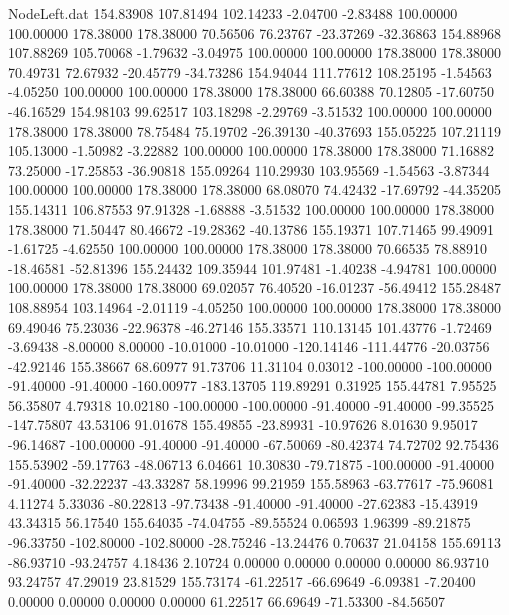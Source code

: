 \begin{filecontents}{NodeLeft.dat}
 154.83908  107.81494  102.14233    -2.04700   -2.83488  100.00000  100.00000  178.38000  178.38000   70.56506   76.23767  -23.37269  -32.36863
 154.88968  107.88269  105.70068    -1.79632   -3.04975  100.00000  100.00000  178.38000  178.38000   70.49731   72.67932  -20.45779  -34.73286
 154.94044  111.77612  108.25195    -1.54563   -4.05250  100.00000  100.00000  178.38000  178.38000   66.60388   70.12805  -17.60750  -46.16529
 154.98103   99.62517  103.18298    -2.29769   -3.51532  100.00000  100.00000  178.38000  178.38000   78.75484   75.19702  -26.39130  -40.37693
 155.05225  107.21119  105.13000    -1.50982   -3.22882  100.00000  100.00000  178.38000  178.38000   71.16882   73.25000  -17.25853  -36.90818
 155.09264  110.29930  103.95569    -1.54563   -3.87344  100.00000  100.00000  178.38000  178.38000   68.08070   74.42432  -17.69792  -44.35205
 155.14311  106.87553   97.91328    -1.68888   -3.51532  100.00000  100.00000  178.38000  178.38000   71.50447   80.46672  -19.28362  -40.13786
 155.19371  107.71465   99.49091    -1.61725   -4.62550  100.00000  100.00000  178.38000  178.38000   70.66535   78.88910  -18.46581  -52.81396
 155.24432  109.35944  101.97481    -1.40238   -4.94781  100.00000  100.00000  178.38000  178.38000   69.02057   76.40520  -16.01237  -56.49412
 155.28487  108.88954  103.14964    -2.01119   -4.05250  100.00000  100.00000  178.38000  178.38000   69.49046   75.23036  -22.96378  -46.27146
 155.33571  110.13145  101.43776    -1.72469   -3.69438   -8.00000    8.00000  -10.01000  -10.01000 -120.14146 -111.44776  -20.03756  -42.92146
 155.38667   68.60977   91.73706    11.31104    0.03012 -100.00000 -100.00000  -91.40000  -91.40000 -160.00977 -183.13705  119.89291    0.31925
 155.44781    7.95525   56.35807     4.79318   10.02180 -100.00000 -100.00000  -91.40000  -91.40000  -99.35525 -147.75807   43.53106   91.01678
 155.49855  -23.89931  -10.97626     8.01630    9.95017  -96.14687 -100.00000  -91.40000  -91.40000  -67.50069  -80.42374   74.72702   92.75436
 155.53902  -59.17763  -48.06713     6.04661   10.30830  -79.71875 -100.00000  -91.40000  -91.40000  -32.22237  -43.33287   58.19996   99.21959
 155.58963  -63.77617  -75.96081     4.11274    5.33036  -80.22813  -97.73438  -91.40000  -91.40000  -27.62383  -15.43919   43.34315   56.17540
 155.64035  -74.04755  -89.55524     0.06593    1.96399  -89.21875  -96.33750 -102.80000 -102.80000  -28.75246  -13.24476    0.70637   21.04158
 155.69113  -86.93710  -93.24757     4.18436    2.10724    0.00000    0.00000    0.00000    0.00000   86.93710   93.24757   47.29019   23.81529
 155.73174  -61.22517  -66.69649    -6.09381   -7.20400    0.00000    0.00000    0.00000    0.00000   61.22517   66.69649  -71.53300  -84.56507

\end{filecontents}
